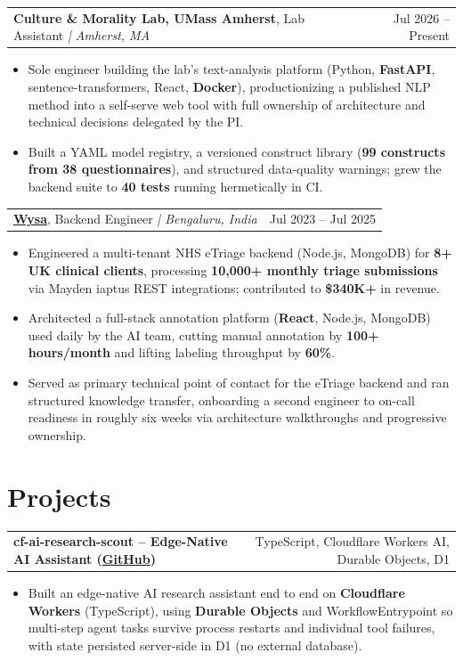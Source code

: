 \documentclass[letterpaper,11pt]{article}
\makeatletter
\newcommand{\expItem}[4]{%
  \vspace{2pt}
  \begin{tabular*}{\textwidth}{@{}l@{\extracolsep{\fill}}r@{}}
    \textbf{#1}, #2 \textit{| #3} & #4 \\
  \end{tabular*}\par\vspace{-3pt}
}
\newcommand{\projItem}[2]{%
  \vspace{2pt}
  \begin{tabular*}{\textwidth}{@{}l@{\extracolsep{\fill}}r@{}}
    \textbf{#1} & #2 \\
  \end{tabular*}\par\vspace{-3pt}
}
\makeatother
\begin{document}
\expItem{Culture \& Morality Lab, UMass Amherst}{Lab Assistant}{Amherst, MA}{Jul 2026 -- Present}
\begin{itemize}
  \item Sole engineer building the lab's text-analysis platform (Python, \textbf{FastAPI}, sentence-transformers, React, \textbf{Docker}), productionizing a published NLP method into a self-serve web tool with full ownership of architecture and technical decisions delegated by the PI.
  \item Built a YAML model registry, a versioned construct library (\textbf{99 constructs from 38 questionnaires}), and structured data-quality warnings; grew the backend suite to \textbf{40 tests} running hermetically in CI.
\end{itemize}

\expItem{\href{https://www.wysa.io}{Wysa}}{Backend Engineer}{Bengaluru, India}{Jul 2023 -- Jul 2025}
\begin{itemize}
  \item Engineered a multi-tenant NHS eTriage backend (Node.js, MongoDB) for \textbf{8+ UK clinical clients}, processing \textbf{10{,}000+ monthly triage submissions} via Mayden iaptus REST integrations; contributed to \textbf{\$340K+} in revenue.
  \item Architected a full-stack annotation platform (\textbf{React}, Node.js, MongoDB) used daily by the AI team, cutting manual annotation by \textbf{100+ hours/month} and lifting labeling throughput by \textbf{60\%}.
  \item Served as primary technical point of contact for the eTriage backend and ran structured knowledge transfer, onboarding a second engineer to on-call readiness in roughly six weeks via architecture walkthroughs and progressive ownership.
\end{itemize}

\section{Projects}

\projItem{cf-ai-research-scout -- Edge-Native AI Assistant {\normalfont\small(\href{https://github.com/Deva-1903/cf_ai_research_scout}{GitHub})}}{TypeScript, Cloudflare Workers AI, Durable Objects, D1}
\begin{itemize}
  \item Built an edge-native AI research assistant end to end on \textbf{Cloudflare Workers} (TypeScript), using \textbf{Durable Objects} and WorkflowEntrypoint so multi-step agent tasks survive process restarts and individual tool failures, with state persisted server-side in D1 (no external database).
\end{itemize}
\end{document}
